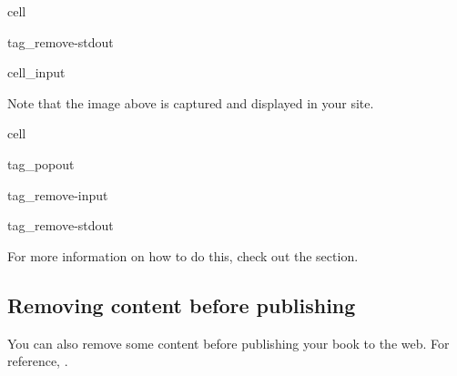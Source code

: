 \documentclass[letterpaper,10pt,english]{jupyterBook}
\begin{document}
\begin{sphinxuseclass}{cell}
\begin{sphinxuseclass}{tag_remove-stdout}
\begin{sphinxVerbatimInput}
\begin{sphinxuseclass}{cell_input}
\begin{sphinxVerbatim}[commandchars=\\\{\}]
    
  
 \PYG{p}{[}  \PYG{p}{]}
\end{sphinxVerbatim}

\end{sphinxuseclass}\end{sphinxVerbatimInput}

\end{sphinxuseclass}
\end{sphinxuseclass}
\sphinxAtStartPar
Note that the image above is captured and displayed in your site.

\begin{sphinxuseclass}{cell}
\begin{sphinxuseclass}{tag_popout}
\begin{sphinxuseclass}{tag_remove-input}
\begin{sphinxuseclass}{tag_remove-stdout}
\end{sphinxuseclass}
\end{sphinxuseclass}
\end{sphinxuseclass}
\end{sphinxuseclass}
\begin{sphinxShadowBox}

\sphinxAtStartPar
For more information on how to do this,
check out the  section.
\end{sphinxShadowBox}


\subsection{Removing content before publishing}
\label{\detokenize{content/1_modeling/notebooks:removing-content-before-publishing}}
\sphinxAtStartPar
You can also remove some content before publishing your book to the web.
For reference, .
\end{document}

